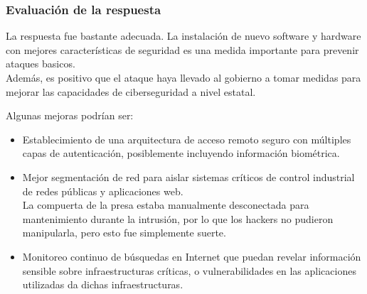 \subsubsection{Evaluación de la respuesta}
La respuesta fue bastante adecuada.
La instalación de nuevo software y hardware con mejores características de seguridad es una medida importante para prevenir ataques basicos.\\
Además, es positivo que el ataque haya llevado al gobierno a tomar medidas para mejorar las capacidades de ciberseguridad a nivel estatal.



Algunas mejoras podrían ser:
\begin{itemize}
    \item Establecimiento de una arquitectura de acceso remoto seguro con múltiples capas de autenticación, posiblemente incluyendo información biométrica.
    \item Mejor segmentación de red para aislar sistemas críticos de control industrial de redes públicas y aplicaciones web.\\
    La compuerta de la presa estaba manualmente desconectada para mantenimiento durante la intrusión, por lo que los hackers no pudieron manipularla, pero esto fue simplemente suerte.
    \item Monitoreo continuo de búsquedas en Internet que puedan revelar información sensible sobre infraestructuras críticas, o vulnerabilidades en las aplicaciones utilizadas da dichas infraestructuras.
\end{itemize}

